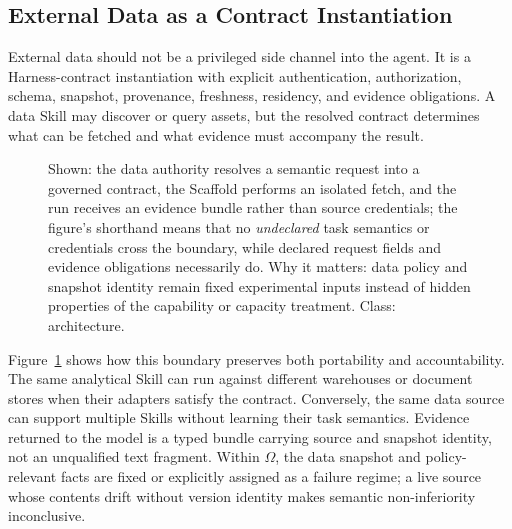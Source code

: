 \subsection{External Data as a Contract Instantiation}

External data should not be a privileged side channel into the agent. It is a Harness-contract instantiation with explicit authentication, authorization, schema, snapshot, provenance, freshness, residency, and evidence obligations. A data Skill may discover or query assets, but the resolved contract determines what can be fetched and what evidence must accompany the result.

\begin{figure}[t]
\centering
\caption{Shown: the data authority resolves a semantic request into a governed contract, the Scaffold performs an isolated fetch, and the run receives an evidence bundle rather than source credentials; the figure's shorthand means that no \emph{undeclared} task semantics or credentials cross the boundary, while declared request fields and evidence obligations necessarily do. Why it matters: data policy and snapshot identity remain fixed experimental inputs instead of hidden properties of the capability or capacity treatment. Class: architecture.}
\label{fig:external-data}
\end{figure}

Figure~\ref{fig:external-data} shows how this boundary preserves both portability and accountability. The same analytical Skill can run against different warehouses or document stores when their adapters satisfy the contract. Conversely, the same data source can support multiple Skills without learning their task semantics. Evidence returned to the model is a typed bundle carrying source and snapshot identity, not an unqualified text fragment. Within $\Omega$, the data snapshot and policy-relevant facts are fixed or explicitly assigned as a failure regime; a live source whose contents drift without version identity makes semantic non-inferiority inconclusive.

